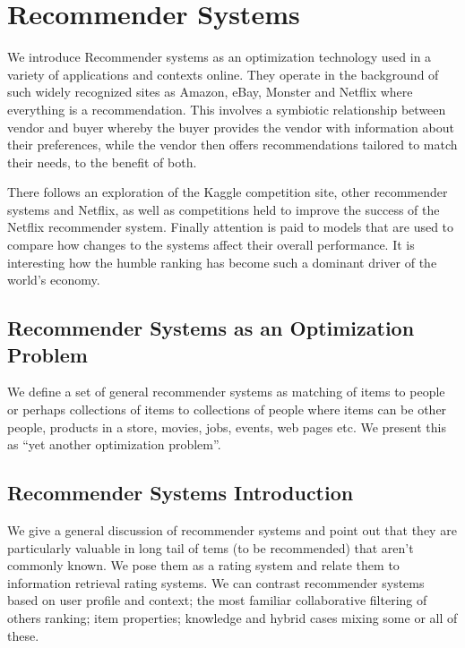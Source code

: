 \section{Recommender Systems}

We introduce Recommender systems as an optimization technology used in a
variety of applications and contexts online. They operate in the
background of such widely recognized sites as Amazon, eBay, Monster and
Netflix where everything is a recommendation. This involves a symbiotic
relationship between vendor and buyer whereby the buyer provides the
vendor with information about their preferences, while the vendor then
offers recommendations tailored to match their needs, to the benefit of
both.

There follows an exploration of the Kaggle competition site, other
recommender systems and Netflix, as well as competitions held to improve
the success of the Netflix recommender system. Finally attention is paid
to models that are used to compare how changes to the systems affect
their overall performance. It is interesting how the humble ranking has
become such a dominant driver of the world's economy.



\subsection{Recommender Systems as an Optimization Problem}

We define a set of general recommender systems as matching of items to
people or perhaps collections of items to collections of people where
items can be other people, products in a store, movies, jobs, events,
web pages etc. We present this as ``yet another optimization problem''.



\subsection{Recommender Systems Introduction}

We give a general discussion of recommender systems and point out that
they are particularly valuable in long tail of tems (to be recommended)
that aren't commonly known. We pose them as a rating system and relate
them to information retrieval rating systems. We can contrast
recommender systems based on user profile and context; the most familiar
collaborative filtering of others ranking; item properties; knowledge
and hybrid cases mixing some or all of these.

